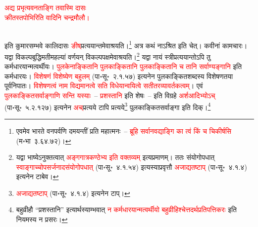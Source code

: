 \centering\textcolor{red}{अद्य प्रभृत्यवनताङ्गि तवास्मि दासः\nopagebreak\\
क्रीतस्तपोभिरिति वादिनि चन्द्रमौलौ।}\nopagebreak\\
\\
\begin{sloppypar}\justifying\noindent इति कुमारसम्भवे कालिदासः \textcolor{red}{ङीष्‌}\-प्रत्ययान्तमेवाश्रयति।\footnote{एवमेव भारते वनपर्वणि दमयन्तीं प्रति महात्मनः~– \textcolor{red}{ब्रूहि सर्वानवद्याङ्गि का त्वं किं च चिकीर्षसि} (म॰भा~३.६४.७२)।} अत्र कथं नाऽश्रित इति चेत्। कवीनां कामचारः। यद्वा विकल्प\-बुद्धिमतीमहल्यां वर्णयन् विकल्प\-पक्षमेवाश्रयति।\footnote{यद्वा भाष्येऽनुक्तत्वात् \textcolor{red}{अङ्ग\-गात्र\-कण्ठेभ्य इति वक्तव्यम्} इत्यप्रमाणम्। ततः संयोगोपधात् \textcolor{red}{स्वाङ्गाच्चोप\-सर्जनादसंयोगोपधात्‌} (पा॰सू॰~४.१.५४) इत्यस्याप्रवृत्तौ \textcolor{red}{अजाद्यतष्टाप्‌} (पा॰सू॰~४.१.४) इत्यनेन टाबेव।} यद्वा नायं स्त्री\-प्रत्ययान्तोऽपि तु कर्मधारयान्मत्वर्थीयः। \textcolor{red}{पुलकेनाङ्कितानि पुलकाङ्कितानि पुलकाङ्कितानि च तानि सर्वाण्यङ्गानि} इति कर्मधारयः। \textcolor{red}{विशेषणं विशेष्येण बहुलम्‌} (पा॰सू॰~२.१.५७) इत्यनेन पुलकाङ्कित\-शब्दस्य विशेषणतया पूर्व\-निपातः। \textcolor{red}{विशेषणत्वं नाम विद्यमानत्वे सति विधेयान्वयित्वे सतीतर\-व्यावर्तकत्वम्‌}। एवं \textcolor{red}{पुलकाङ्कित\-सर्वाङ्गाणि सन्ति यस्याः}~– \textcolor{red}{प्रशस्तानि} इति शेषः~– इति विग्रहे \textcolor{red}{अर्शआदिभ्योऽच्‌} (पा॰सू॰~५.२.१२७) इत्यनेन \textcolor{red}{अच्‌}\-प्रत्यये टापि प्रत्यये\footnote{\textcolor{red}{अजाद्यतष्टाप्‌} (पा॰सू॰~४.१.४) इत्यनेन टाप्।} पुलकाङ्कितसर्वाङ्गा इति दिक्।\footnote{बहुव्रीहौ “प्रशस्तानि” इत्यार्थस्याम्भवात् \textcolor{red}{न कर्मधारयान्मत्वर्थीयो बहुव्रीहिश्चेत्तदर्थ\-प्रतिपत्तिकरः} इति नियमस्य न प्रसरः।}\end{sloppypar}
